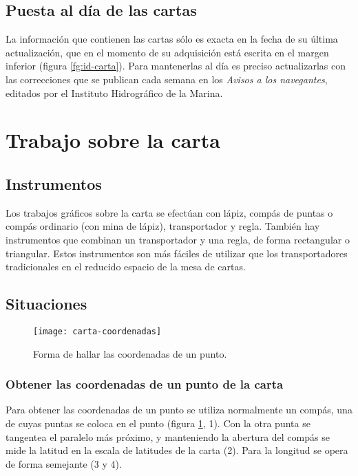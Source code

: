 \subsection{Puesta al día de las cartas }

La información que contienen las cartas sólo es exacta en la fecha de su última actualización, 
que en el momento de su adquisición está escrita en el margen inferior (figura \ref{fg:id-carta}). 
Para mantenerlas al día es preciso actualizarlas con las correcciones que se publican cada 
semana en los \emph{Avisos a los navegantes}, editados por el Instituto Hidrográfico de la 
Marina. 

\section{Trabajo sobre la carta}

\subsection{Instrumentos}
 
Los trabajos gráficos sobre la carta se efectúan con lápiz, compás de puntas o compás 
ordinario (con mina de lápiz), transportador y regla. También hay 
instrumentos que combinan un transportador y una regla, de forma rectangular o triangular.
Estos instrumentos son más fáciles de utilizar que los transportadores tradicionales 
en el reducido espacio de la mesa de cartas. 

\subsection{Situaciones}
 
 \begin{figure}[htbp]
\begin{center}
\texttt{[image: carta-coordenadas]}
\caption{Forma de hallar las coordenadas de un punto.}
\label{fg:carta-coordenadas}
\end{center}
\end{figure}

\subsubsection{Obtener las coordenadas de un punto de la carta}

Para obtener las coordenadas de un punto se utiliza normalmente un compás, una de 
cuyas puntas se coloca en el punto (figura \ref{fg:carta-coordenadas}, 1). 
Con la otra punta se tangentea el paralelo más próximo, y manteniendo la abertura 
del compás se mide la latitud en la escala de latitudes de la carta (2). 
Para la longitud se opera de forma semejante (3 y 4). 


